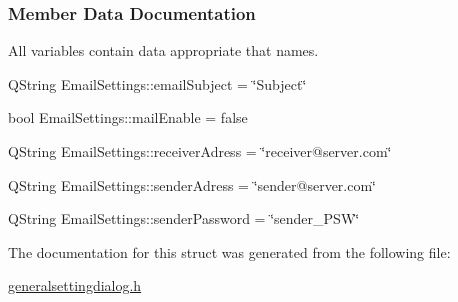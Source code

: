 \subsubsection{Member Data Documentation} \mbox{\label{structEmailSettings_a99652b4dac6fae84c217cc4b7f88bc0e}} 
All variables contain data appropriate that names.
\begin{DoxyCompactItemize}
\item {\footnotesize\ttfamily Q\+String Email\+Settings\+::\texorpdfstring{email\+Subject}{emailSubject} = \char`\"{}Subject\char`\"{}}
\mbox{\label{structEmailSettings_abaf7163e9419cd940d67ad54a588cbb0}} 
\\
\item {\footnotesize\ttfamily bool Email\+Settings\+::\texorpdfstring{mail\+Enable}{mailEnable} = false}
\mbox{\label{structEmailSettings_ab9270460446fa9329d7408b7c4755c85}} 
\\
\item {\footnotesize\ttfamily Q\+String Email\+Settings\+::\texorpdfstring{receiver\+Adress}{receiverAdress} = \char`\"{}receiver@server.\+com\char`\"{}}
\mbox{\label{structEmailSettings_a4822e2b6d8b205ee6da166d0e59401bb}} 
\\
\item {\footnotesize\ttfamily Q\+String Email\+Settings\+::\texorpdfstring{sender\+Adress}{senderAdress} = \char`\"{}sender@server.\+com\char`\"{}}
\mbox{\label{structEmailSettings_a7b1aeb6be785ede7976f820e44826441}} 
\\
\item {\footnotesize\ttfamily Q\+String Email\+Settings\+::\texorpdfstring{sender\+Password}{senderPassword} = \char`\"{}sender\+\_\+\+P\+SW\char`\"{}}\\
\end{DoxyCompactItemize}


The documentation for this struct was generated from the following file\+:\begin{DoxyCompactItemize}
\item 
\mbox{\hyperlink{generalsettingdialog_8h}{generalsettingdialog.\+h}}\end{DoxyCompactItemize}
\newpage